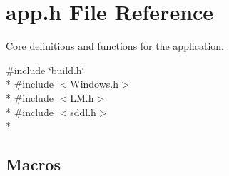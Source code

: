\section{app.\-h File Reference}
\label{app_8h}


Core definitions and functions for the application.  


{\ttfamily \#include \char`\"{}build.\-h\char`\"{}}\\*
{\ttfamily \#include $<$Windows.\-h$>$}\\*
{\ttfamily \#include $<$L\-M.\-h$>$}\\*
{\ttfamily \#include $<$sddl.\-h$>$}\\*
\subsection*{Macros}
